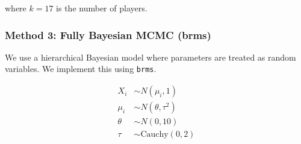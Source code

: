 \documentclass[
  letterpaper,
  DIV=11,
  numbers=noendperiod]{scrreprt}
\newenvironment{Shaded}{\begin{snugshade}}{\end{snugshade}}
\newcommand{\CommentTok}[1]{\textcolor[rgb]{0.37,0.37,0.37}{#1}}
\newcommand{\DecValTok}[1]{\textcolor[rgb]{0.68,0.00,0.00}{#1}}
\newcommand{\FunctionTok}[1]{\textcolor[rgb]{0.28,0.35,0.67}{#1}}
\newcommand{\NormalTok}[1]{\textcolor[rgb]{0.00,0.23,0.31}{#1}}
\newcommand{\OtherTok}[1]{\textcolor[rgb]{0.00,0.23,0.31}{#1}}
\newcommand{\SpecialCharTok}[1]{\textcolor[rgb]{0.37,0.37,0.37}{#1}}
\renewcommand{\[}{\begin{equation}}
\renewcommand{\]}{\end{equation}}
\theoremstyle{definition}
\theoremstyle{plain}
\theoremstyle{plain}
\theoremstyle{plain}
\theoremstyle{definition}
\theoremstyle{plain}
\theoremstyle{remark}
\begin{document}
where \(k=17\) is the number of players.

\begin{Shaded}
\end{Shaded}

\subsubsection{Method 3: Fully Bayesian MCMC
(brms)}\label{method-3-fully-bayesian-mcmc-brms}

We use a hierarchical Bayesian model where parameters are treated as
random variables. We implement this using \texttt{brms}.

\[
\begin{aligned}
X_i &\sim N(\mu_i, 1) \\
\mu_i &\sim N(\theta, \tau^2) \\
\theta &\sim N(0, 10) \\
\tau &\sim \text{Cauchy}(0, 2)
\end{aligned}
\]
\end{document}
